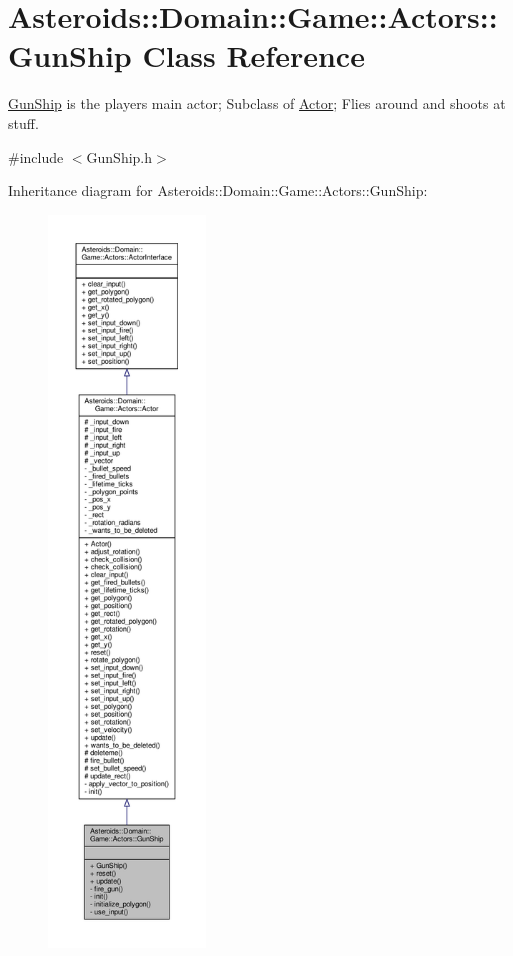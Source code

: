 \hypertarget{classAsteroids_1_1Domain_1_1Game_1_1Actors_1_1GunShip}{}\section{Asteroids\+:\+:Domain\+:\+:Game\+:\+:Actors\+:\+:Gun\+Ship Class Reference}
\label{classAsteroids_1_1Domain_1_1Game_1_1Actors_1_1GunShip}


\hyperlink{classAsteroids_1_1Domain_1_1Game_1_1Actors_1_1GunShip}{Gun\+Ship} is the player\textquotesingle{}s main actor; Subclass of \hyperlink{classAsteroids_1_1Domain_1_1Game_1_1Actors_1_1Actor}{Actor}; Flies around and shoots at stuff.  




{\ttfamily \#include $<$Gun\+Ship.\+h$>$}



Inheritance diagram for Asteroids\+:\+:Domain\+:\+:Game\+:\+:Actors\+:\+:Gun\+Ship\+:\nopagebreak
\begin{figure}[H]
\begin{center}
\leavevmode
\includegraphics[height=550pt]{classAsteroids_1_1Domain_1_1Game_1_1Actors_1_1GunShip__inherit__graph}
\end{center}
\end{figure}


